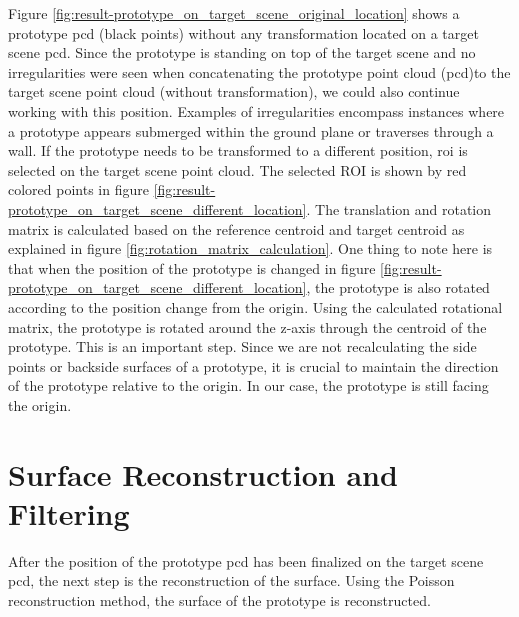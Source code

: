 Figure \ref{fig:result-prototype_on_target_scene_original_location} shows a prototype \acrshort{pcd} (black points) without any transformation located on a target scene \acrshort{pcd}. Since the prototype is standing on top of the target scene and no irregularities were seen when concatenating the prototype point cloud (\acrshort{pcd})to the target scene point cloud (without transformation), we could also continue working with this position. Examples of irregularities encompass instances where a prototype appears submerged within the ground plane or traverses through a wall. If the prototype needs to be transformed to a different position, \acrfull{roi} is selected on the target scene point cloud. The selected ROI is shown by red colored points in figure \ref{fig:result-prototype_on_target_scene_different_location}. The translation and rotation matrix is calculated based on the reference centroid and target centroid as explained in figure \ref{fig:rotation_matrix_calculation}. One thing to note here is that when the position of the prototype is changed in figure \ref{fig:result-prototype_on_target_scene_different_location}, the prototype is also rotated according to the position change from the origin. Using the calculated rotational matrix, the prototype is rotated around the z-axis through the centroid of the prototype. This is an important step. Since we are not recalculating the side points or backside surfaces of a prototype, it is crucial to maintain the direction of the prototype relative to the origin. In our case, the prototype is still facing the origin.

\section{Surface Reconstruction and Filtering}
After the position of the prototype \acrshort{pcd} has been finalized on the target scene \acrshort{pcd}, the next step is the reconstruction of the surface. Using the Poisson reconstruction method, the surface of the prototype is reconstructed.

